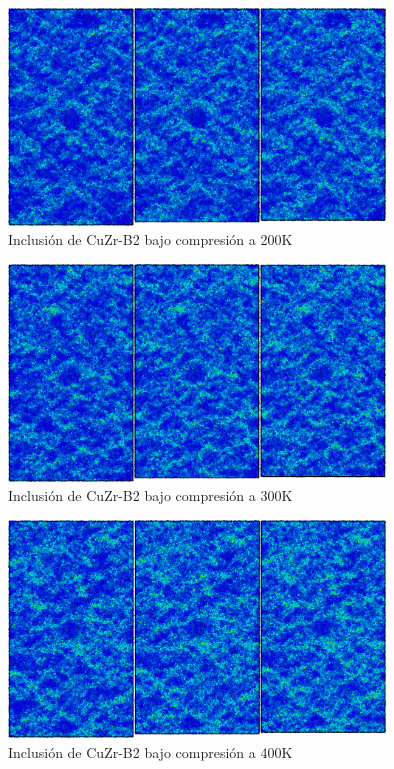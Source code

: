 \begin{figure}[htp]
\centering
\includegraphics[width=10cm]{../ResumenImagenes/Figures/NanoParticles/Snapshots/B2SphereCompression_200K_Snapshots.png}
\caption{Inclusión de CuZr-B2 bajo compresión a 200K}
\label{C4:fg:snapshot_comp_B2_200K}
\end{figure}

\begin{figure}[htp]
\centering
\includegraphics[width=10cm]{../ResumenImagenes/Figures/NanoParticles/Snapshots/B2SphereCompression_300K_Snapshots.png}
\caption{Inclusión de CuZr-B2 bajo compresión a 300K}
\label{C4:fg:snapshot_comp_B2_300K}
\end{figure}

\begin{figure}[htp]
\centering
\includegraphics[width=10cm]{../ResumenImagenes/Figures/NanoParticles/Snapshots/B2SphereCompression_400K_Snapshots.png}
\caption{Inclusión de CuZr-B2 bajo compresión a 400K}
\label{C4:fg:snapshot_comp_B2_400K}
\end{figure}

